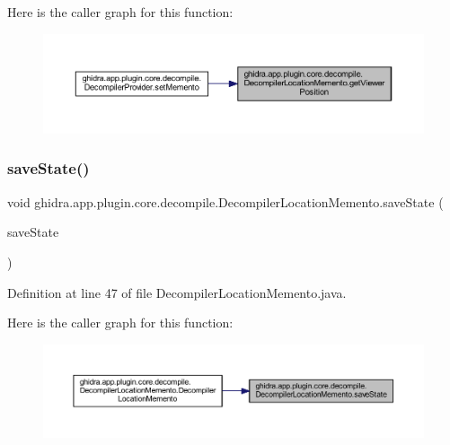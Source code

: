 Here is the caller graph for this function\+:
\nopagebreak
\begin{figure}[H]
\begin{center}
\leavevmode
\includegraphics[width=350pt]{classghidra_1_1app_1_1plugin_1_1core_1_1decompile_1_1_decompiler_location_memento_af8a3b0a5ae9e837634f352233b0d56e9_icgraph}
\end{center}
\end{figure}
\mbox{\label{classghidra_1_1app_1_1plugin_1_1core_1_1decompile_1_1_decompiler_location_memento_a434fa0a24811e2d0b021a1f909ea9595}} 
\subsubsection{\texorpdfstring{saveState()}{saveState()}}
{\footnotesize\ttfamily void ghidra.\+app.\+plugin.\+core.\+decompile.\+Decompiler\+Location\+Memento.\+save\+State (\begin{DoxyParamCaption}\item[{Save\+State}]{save\+State }\end{DoxyParamCaption})\hspace{0.3cm}{\ttfamily [inline]}}



Definition at line 47 of file Decompiler\+Location\+Memento.\+java.

Here is the caller graph for this function\+:
\nopagebreak
\begin{figure}[H]
\begin{center}
\leavevmode
\includegraphics[width=350pt]{classghidra_1_1app_1_1plugin_1_1core_1_1decompile_1_1_decompiler_location_memento_a434fa0a24811e2d0b021a1f909ea9595_icgraph}
\end{center}
\end{figure}


